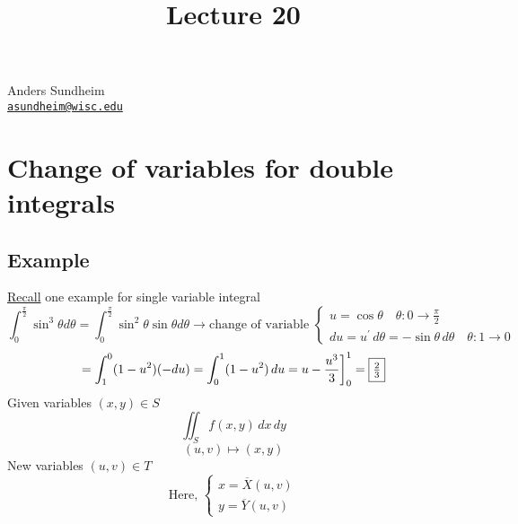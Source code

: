 \documentclass[12pt]{article}
\title{Lecture 20}
\newcommand{\prm}{^\prime}
\begin{document}
\maketitle
\vspace*{-0.25in}
\begin{center}
	Anders Sundheim \\
	\href{mailto:asundheim@wisc.edu}{{\tt asundheim@wisc.edu}}
\end{center}
\section*{Change of variables for double integrals}
    \subsection*{Example}
        \underline{Recall} one example for single variable integral \\
        \[ 
            \int_0^{\frac{\pi}{2}}\sin^3\theta d\theta=\int_0^{\frac{\pi}{2}}\sin^2\theta\sin\theta d\theta\rightarrow\text{change of variable } \begin{cases}
                u=\cos\theta\quad\theta:0\rightarrow\frac{\pi}{2} \\
                du=u\prm\,d\theta=-\sin\theta\,d\theta\quad\theta:1\rightarrow 0
            \end{cases}
        \]
        \[ =\int_1^0(1-u^2)(-du)=\int_0^1(1-u^2)\,du=u-\frac{u^3}{3}\bigg]_0^1=\fbox{$\frac{2}{3}$} \]
        Given variables $(x,y)\in S$ \\
        \[ \iint_Sf(x,y)\,dx\,dy \]
        \[ (u,v)\mapsto(x,y) \]
        New variables $(u,v)\in T$ \\
        \[ 
            \text{Here, }
            \begin{cases}
                x=\overline{X}(u,v) \\
                y=\overline{Y}(u,v)
            \end{cases}
        \]
\end{document}

